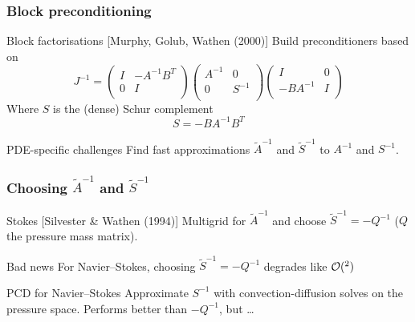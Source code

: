 \documentclass[presentation, 10pt]{beamer}
\let\Re\relax
\DeclareMathOperator{\Re}{Re}
\begin{document}
\begin{frame}[t]
  \frametitle{Block preconditioning}
  \begin{block}{Block factorisations [Murphy, Golub, Wathen (2000)]}
    \vspace{0.25\baselineskip}
    Build preconditioners based on
    \begin{equation*}
      J^{-1} =
      \begin{pmatrix}
        I   & -A^{-1} B^T \\
        0 & I \\
      \end{pmatrix}
      \begin{pmatrix}
        A^{-1}  & 0 \\
        0 & S^{-1} \\
      \end{pmatrix}
      \begin{pmatrix}
        I   & 0 \\
        -BA^{-1} & I \\
      \end{pmatrix}
    \end{equation*}
    Where $S$ is the (dense) Schur complement
    \begin{equation*}
      S = - B A^{-1} B^T
    \end{equation*}
  \end{block}
  \begin{block}{PDE-specific challenges}
    \vspace{0.25\baselineskip}
    Find fast approximations $\tilde{A}^{-1}$ and $\tilde{S}^{-1}$ to
    $A^{-1}$ and $S^{-1}$.
  \end{block}
\end{frame}

\begin{frame}[t]
  \frametitle{Choosing $\tilde{A}^{-1}$ and $\tilde{S}^{-1}$}

  \begin{block}{Stokes [Silvester \& Wathen (1994)]}
    \vspace{0.25\baselineskip}
    Multigrid for $\tilde{A}^{-1}$ and choose $\tilde{S}^{-1} = -Q^{-1}$ ($Q$ the pressure mass matrix).
  \end{block}
  \begin{alertblock}{Bad news}
    \vspace{0.25\baselineskip}
    For Navier--Stokes, choosing $\tilde{S}^{-1} = -Q^{-1}$ degrades like $\mathcal{O}(\Re^2)$
  \end{alertblock}
  \begin{block}{PCD for Navier--Stokes}
    \vspace{0.25\baselineskip}
    Approximate $S^{-1}$ with convection-diffusion solves on the
    pressure space. Performs better than $-Q^{-1}$, but \dots
  \end{block}
\end{frame}
\end{document}

